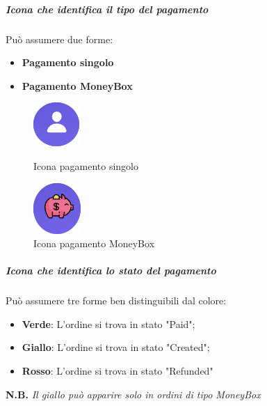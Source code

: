             \subparagraph{Icona che identifica il tipo del pagamento}
            Può assumere due forme:
            \begin{itemize}
                \item \textbf{Pagamento singolo}
                \item \textbf{Pagamento MoneyBox}
            \end{itemize}
            \begin{figure}[H]
                \centering
                \begin{minipage}{0.45\textwidth}
                    \centering
                    \includegraphics[scale=0.8]{immagini/Transaction/singleIcon.png} 
                    \caption{Icona pagamento singolo}
                \end{minipage}\hfill
                \begin{minipage}{0.45\textwidth}
                \centering
                    \includegraphics[scale=0.8]{immagini/Transaction/MoneyBoxIcon.png} 
                    \caption{Icona pagamento MoneyBox}
                \end{minipage}
            \end{figure}
            \subparagraph{Icona che identifica lo stato del pagamento}
            Può assumere tre forme ben distinguibili dal colore:
            \begin{itemize}
                \item \textbf{Verde}: L'ordine si trova in stato "Paid";
                \item \textbf{Giallo}: L'ordine si trova in stato "Created";
                \item \textbf{Rosso}: L'ordine si trova in stato "Refunded"
            \end{itemize}
            \textbf{N.B.} \textit{Il giallo può apparire solo in ordini di tipo MoneyBox}
